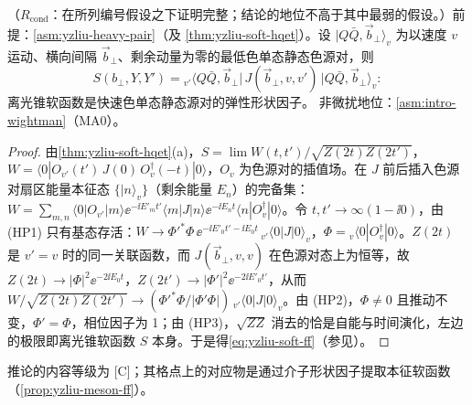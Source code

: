 \begin{corollary}\label{cor:yzliu-soft-form-factor}
（$R_{\mathrm{cond}}$：在所列编号假设之下证明完整；结论的地位不高于其中最弱的假设。）前提：\cref{asm:yzliu-heavy-pair}（及 \cref{thm:yzliu-soft-hqet}）。设 $|Q\bar Q,\vec b_\perp\rangle_v$ 为以速度 $v$ 运动、横向间隔 $\vec b_\perp$、剩余动量为零的最低色单态静态色源对，则
\begin{equation}\label{eq:yzliu-soft-ff}
S(b_\perp,Y,Y')={}_{v'}\big\langle Q\bar Q,\vec b_\perp\big|\,J(\vec b_\perp,v,v')\,\big|Q\bar Q,\vec b_\perp\big\rangle_v :
\end{equation}
离光锥软函数是快速色单态静态源对的弹性形状因子。%
非微扰地位：\cref{asm:intro-wightman}（MA0）。
\end{corollary}

\begin{proof}
由\cref{thm:yzliu-soft-hqet}(a)，$S=\lim W(t,t')/\sqrt{Z(2t)Z(2t')}$，$W=\langle0|O_{v'}(t')\,J(0)\,O^\dagger_v(-t)|0\rangle$，$O_v$ 为色源对的插值场。在 $J$ 前后插入色源对扇区能量本征态 $\{|n\rangle_v\}$（剩余能量 $E_n$）的完备集：$W=\sum_{m,n}\langle0|O_{v'}|m\rangle\ee^{-\ii E'_mt'}\langle m|J|n\rangle\ee^{-\ii E_nt}\langle n|O_v^\dagger|0\rangle$。令 $t,t'\to\infty(1-\ii0)$，由 (HP1) 只有基态存活：$W\to\Phi'^*\Phi\,\ee^{-\ii E'_0t'-\ii E_0t}\,{}_{v'}\langle0|J|0\rangle_v$，$\Phi={}_v\langle0|O_v^\dagger|0\rangle$。$Z(2t)$ 是 $v'=v$ 时的同一关联函数，而 $J(\vec b_\perp,v,v)$ 在色源对态上为恒等，故 $Z(2t)\to|\Phi|^2\ee^{-2\ii E_0t}$，$Z(2t')\to|\Phi'|^2\ee^{-2\ii E'_0t'}$，从而 $W/\sqrt{Z(2t)Z(2t')}\to(\Phi'^*\Phi/|\Phi'\Phi|)\,{}_{v'}\langle0|J|0\rangle_v$。由 (HP2)，$\Phi\ne0$ 且推动不变，$\Phi'=\Phi$，相位因子为 1；由 (HP3)，$\sqrt{ZZ}$ 消去的恰是自能与时间演化，左边的极限即离光锥软函数 $S$ 本身。于是得\cref{eq:yzliu-soft-ff}（参见\cite[式~(8)、(11)]{Ji:2019sxk}）。
\end{proof}

推论的内容等级为 [C]；其格点上的对应物是通过介子形状因子提取本征软函数（\cref{prop:yzliu-meson-ff}）。
